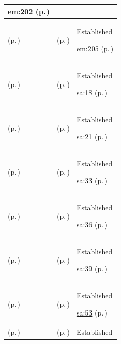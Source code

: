 \begin{longtable}{|>{\raggedright\arraybackslash}p{0.27\TableWidth}|>{\raggedright\arraybackslash}p{0.27\TableWidth}|>{\raggedright\arraybackslash}p{0.46\TableWidth}|}
 \hyperref[rad:em:193]{em:202} (p.\,\pageref{rad:em:193})\\\hline
\nameref{function:maintain-device-communication-endpoints} (p.\,\pageref{function:maintain-device-communication-endpoints}) & \nameref{feature:feat-em-31} (p.\,\pageref{feature:feat-em-31}) & Established

 \hyperref[rad:em:193]{em:205} (p.\,\pageref{rad:em:193})\\\hline
\nameref{function:receive-client-demographic-change} (p.\,\pageref{function:receive-client-demographic-change}) & \nameref{feature:feat-sa-01} (p.\,\pageref{feature:feat-sa-01}) & Established

 \hyperref[rad:sa:12]{sa:18} (p.\,\pageref{rad:sa:12})\\\hline
\nameref{function:distribute-governed-demographic-change} (p.\,\pageref{function:distribute-governed-demographic-change}) & \nameref{feature:feat-sa-02} (p.\,\pageref{feature:feat-sa-02}) & Established

 \hyperref[rad:sa:12]{sa:21} (p.\,\pageref{rad:sa:12})\\\hline
\nameref{function:receive-referral} (p.\,\pageref{function:receive-referral}) & \nameref{feature:feat-sa-03} (p.\,\pageref{feature:feat-sa-03}) & Established

 \hyperref[rad:sa:28]{sa:33} (p.\,\pageref{rad:sa:28})\\\hline
\nameref{function:assemble-referral-context} (p.\,\pageref{function:assemble-referral-context}) & \nameref{feature:feat-sa-04} (p.\,\pageref{feature:feat-sa-04}) & Established

 \hyperref[rad:sa:28]{sa:36} (p.\,\pageref{rad:sa:28})\\\hline
\nameref{function:manage-referral-progression} (p.\,\pageref{function:manage-referral-progression}) & \nameref{feature:feat-sa-05} (p.\,\pageref{feature:feat-sa-05}) & Established

 \hyperref[rad:sa:28]{sa:39} (p.\,\pageref{rad:sa:28})\\\hline
\nameref{function:receive-appointment-notification} (p.\,\pageref{function:receive-appointment-notification}) & \nameref{feature:feat-sa-06} (p.\,\pageref{feature:feat-sa-06}) & Established

 \hyperref[rad:sa:48]{sa:53} (p.\,\pageref{rad:sa:48})\\\hline
\nameref{function:synchronise-appointment-status} (p.\,\pageref{function:synchronise-appointment-status}) & \nameref{feature:feat-sa-07} (p.\,\pageref{feature:feat-sa-07}) & Established


\end{longtable}

